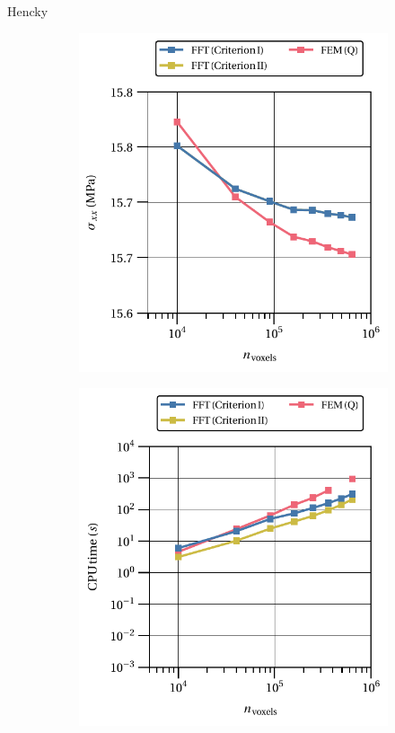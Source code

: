 Hencky

\begin{figure}[hbt]
\centering
	\begin{subfigure}[b]{0.49\textwidth}
    \centering
    \includegraphics[width=\textwidth]{figures/hencky_2D_normal_homo_stress_11_vs_n_voxels}
    \caption{}
    \label{subfig:hencky_2D_normal_homo_stress_11_vs_n_voxels}
  \end{subfigure}
  \begin{subfigure}[b]{0.49\textwidth}
    \centering
    \includegraphics[width=\textwidth]{figures/hencky_2D_normal_cpu_time_vs_n_voxels}

\end{subfigure}
\end{figure}

